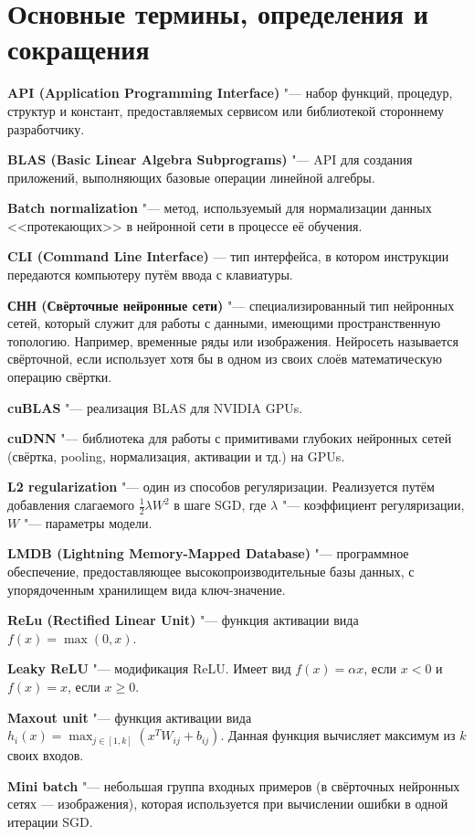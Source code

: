 \section*{Основные термины, определения и сокращения}
\textbf{API (Application Programming Interface)} "--- набор функций, процедур, структур и констант, предоставляемых сервисом или 
библиотекой стороннему разработчику. 

\textbf{BLAS (Basic Linear Algebra Subprograms)} "--- API для создания приложений, выполняющих базовые операции линейной алгебры.

\textbf{Batch normalization} "--- метод, используемый для нормализации данных <<протекающих>> в нейронной сети в процессе её обучения.

\textbf{CLI (Command Line Interface)} --- тип интерфейса, в котором инструкции передаются компьютеру путём ввода с клавиатуры.

\textbf{СНН (Свёрточные нейронные сети)} "--- специализированный тип нейронных сетей,
который служит для работы с данными, имеющими пространственную топологию. Например, временные ряды или изображения.
Нейросеть называется свёрточной, если использует хотя бы в одном из своих слоёв математическую операцию свёртки.

\textbf{cuBLAS} "--- реализация BLAS для NVIDIA GPUs.

\textbf{cuDNN} "--- библиотека для работы с примитивами глубоких нейронных сетей (свёртка, pooling, нормализация,
активации и тд.) на GPUs.

\textbf{L2 regularization} "--- один из способов регуляризации. Реализуется путём добавления слагаемого $\frac{1}{2}\lambda W^2$ в 
шаге SGD, где $\lambda$ "--- коэффициент регуляризации, $W$ "--- параметры модели.

\textbf{LMDB (Lightning Memory-Mapped Database)} "--- программное обеспечение, предоставляющее высокопроизводительные базы данных,
с упорядоченным хранилищем вида ключ-значение.

\textbf{ReLu (Rectified Linear Unit)} "--- функция активации вида $f(x) = \max(0, x)$.

\textbf{Leaky ReLU} "--- модификация ReLU. Имеет вид  $f(x)=\alpha x$, если $x<0$ и $f(x)=x$, если $x \geq 0$.

\textbf{Maxout unit} "--- функция активации вида $h_i(x) = \max_{j \in [1,k]}(x^T W_{ij} + b_{ij})$. Данная функция вычисляет
максимум из $k$ своих входов.

\textbf{Mini batch} "--- небольшая группа входных примеров (в свёрточных нейронных сетях --- изображения), которая используется
при вычислении ошибки в одной итерации SGD.

